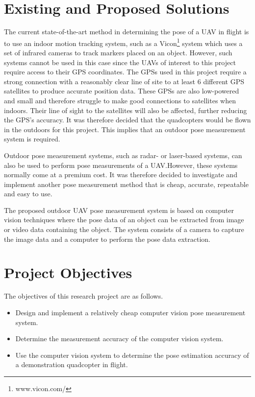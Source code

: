 \section{Existing and Proposed Solutions}

The current state-of-the-art method in determining the pose of a UAV in flight is to use an indoor motion tracking system, such as a Vicon\footnote{www.vicon.com/} system which uses a set of infrared cameras to track markers placed on an object. However, such systems cannot be used in this case since the UAVs of interest to this project require access to their GPS coordinates. The GPSs used in this project require a strong connection with a reasonably clear line of site to at least 6 different GPS satellites to produce accurate position data. These GPSs are also low-powered and small and therefore struggle to make good connections to satellites when indoors. Their line of sight to the satellites will also be affected, further reducing the GPS's accuracy. It was therefore decided that the quadcopters would be flown in the outdoors for this project. This implies that an outdoor pose measurement system is required. 

Outdoor pose measurement systems, such as radar- or laser-based systems, can also be used to perform pose measurements of a UAV.\@ However, these systems normally come at a premium cost. It was therefore decided to investigate and implement another pose measurement method that is cheap, accurate, repeatable and easy to use. 

The proposed outdoor UAV pose measurement system is based on computer vision techniques where the pose data of an object can be extracted from image or video data containing the object. The system consists of a camera to capture the image data and a computer to perform the pose data extraction. 

\section{Project Objectives}

The objectives of this research project are as follows. 

\begin{itemize}
  \item Design and implement a relatively cheap computer vision pose measurement system.
  \item Determine the measurement accuracy of the computer vision system.
  \item Use the computer vision system to determine the pose estimation accuracy of a demonstration quadcopter in flight. 
\end{itemize}

